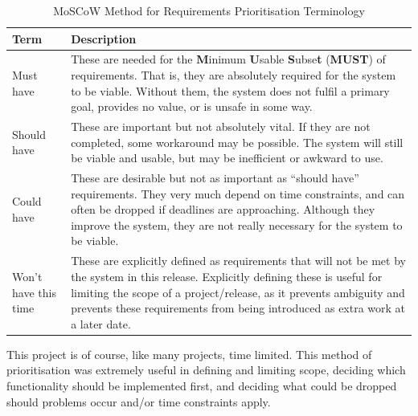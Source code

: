 \documentclass[11pt,openright,a4paper]{report}
\begin{document}
\begin{table}[ht]
\centering
\caption{MoSCoW Method for Requirements Prioritisation Terminology}
\label{table:moscow}
\begin{tabular}{|p{4cm}|p{10cm}|}
\hline
\textbf{Term} & \textbf{Description} \\ \hline
Must have & These are needed for the \textbf{M}inimum \textbf{U}sable \textbf{S}ubse\textbf{t} (\textbf{MUST}) of requirements. That is, they are absolutely required for the system to be viable. Without them, the system does not fulfil a primary goal, provides no value, or is unsafe in some way. \\  \hline
Should have & These are important but not absolutely vital. If they are not completed, some workaround may be possible. The system will still be viable and usable, but may be inefficient or awkward to use. \\ \hline
Could have & These are desirable but not as important as \enquote{should have} requirements. They very much depend on time constraints, and can often be dropped if deadlines are approaching. Although they improve the system, they are not really necessary for the system to be viable. \\ \hline
Won't have this time & These are explicitly defined as requirements that will not be met by the system in this release. Explicitly defining these is useful for limiting the scope of a project/release, as it prevents ambiguity and prevents these requirements from being introduced as extra work at a later date. \\ \hline
\end{tabular}
\end{table}

\newpage
This project is of course, like many projects, time limited. This method of prioritisation was extremely useful in defining and limiting scope, deciding which functionality should be implemented first, and deciding what could be dropped should problems occur and/or time constraints apply.
\end{document}
